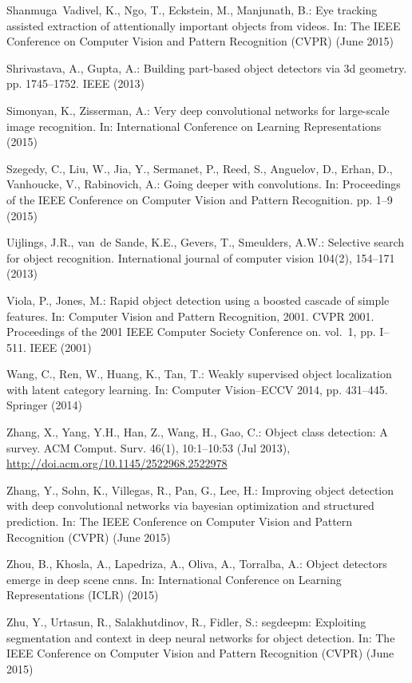 \documentclass[runningheads]{llncs}
\begin{document}
\begin{thebibliography}{10}
Shanmuga~Vadivel, K., Ngo, T., Eckstein, M., Manjunath, B.: Eye tracking
  assisted extraction of attentionally important objects from videos. In: The
  IEEE Conference on Computer Vision and Pattern Recognition (CVPR) (June 2015)

Shrivastava, A., Gupta, A.: Building part-based object detectors via 3d
  geometry. pp. 1745--1752. IEEE (2013)

Simonyan, K., Zisserman, A.: Very deep convolutional networks for large-scale
  image recognition. In: International Conference on Learning Representations
  (2015)

Szegedy, C., Liu, W., Jia, Y., Sermanet, P., Reed, S., Anguelov, D., Erhan, D.,
  Vanhoucke, V., Rabinovich, A.: Going deeper with convolutions. In:
  Proceedings of the IEEE Conference on Computer Vision and Pattern
  Recognition. pp. 1--9 (2015)

Uijlings, J.R., van~de Sande, K.E., Gevers, T., Smeulders, A.W.: Selective
  search for object recognition. International journal of computer vision
  104(2),  154--171 (2013)

Viola, P., Jones, M.: Rapid object detection using a boosted cascade of simple
  features. In: Computer Vision and Pattern Recognition, 2001. CVPR 2001.
  Proceedings of the 2001 IEEE Computer Society Conference on. vol.~1, pp.
  I--511. IEEE (2001)

Wang, C., Ren, W., Huang, K., Tan, T.: Weakly supervised object localization
  with latent category learning. In: Computer Vision--ECCV 2014, pp. 431--445.
  Springer (2014)

Zhang, X., Yang, Y.H., Han, Z., Wang, H., Gao, C.: Object class detection: A
  survey. ACM Comput. Surv.  46(1),  10:1--10:53 (Jul 2013),
  \url{http://doi.acm.org/10.1145/2522968.2522978}

Zhang, Y., Sohn, K., Villegas, R., Pan, G., Lee, H.: Improving object detection
  with deep convolutional networks via bayesian optimization and structured
  prediction. In: The IEEE Conference on Computer Vision and Pattern
  Recognition (CVPR) (June 2015)

Zhou, B., Khosla, A., Lapedriza, A., Oliva, A., Torralba, A.: Object detectors
  emerge in deep scene cnns. In: International Conference on Learning
  Representations (ICLR) (2015)

Zhu, Y., Urtasun, R., Salakhutdinov, R., Fidler, S.: segdeepm: Exploiting
  segmentation and context in deep neural networks for object detection. In:
  The IEEE Conference on Computer Vision and Pattern Recognition (CVPR) (June
  2015)

\end{thebibliography}
\end{document}
